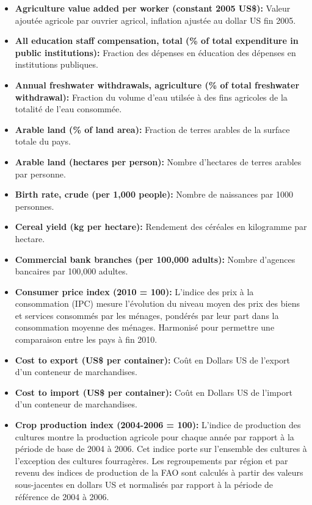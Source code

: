 \begin{itemize}
		\item \textbf{ Agriculture value added per worker (constant 2005 US\$):} Valeur ajoutée agricole par ouvrier agricol, inflation ajustée au dollar US fin 2005.
		\item \textbf{ All education staff compensation, total (\% of total expenditure in public institutions):} Fraction des dépenses en éducation des dépenses en institutions publiques.
		\item \textbf{ Annual freshwater withdrawals, agriculture (\% of total freshwater withdrawal):} Fraction du volume d'eau utilsée à des fins agricoles de la totalité de l'eau consommée.
		\item \textbf{ Arable land (\% of land area):} Fraction de terres arables de la surface totale du pays.
		\item \textbf{ Arable land (hectares per person):} Nombre d'hectares de terres arables par personne.
		\item \textbf{ Birth rate, crude (per 1,000 people):} Nombre de naissances par 1000 personnes.
		\item \textbf{ Cereal yield (kg per hectare):} Rendement des céréales en kilogramme par hectare.
		\item \textbf{ Commercial bank branches (per 100,000 adults):} Nombre d'agences bancaires par 100,000 adultes.
		\item \textbf{ Consumer price index (2010 = 100):} L'indice des prix à la consommation (IPC) mesure l'évolution du niveau moyen des prix des biens et services consommés par les ménages, pondérés par leur part dans la consommation moyenne des ménages. Harmonisé pour permettre une comparaison entre les pays à fin 2010.
		\item \textbf{ Cost to export (US\$ per container):} Coût en Dollars US de l'export d'un conteneur de marchandises.
		\item \textbf{ Cost to import (US\$ per container):} Coût en Dollars US de l'import d'un conteneur de marchandises.
		\item \textbf{ Crop production index (2004-2006 = 100):} 
		L'indice de production des cultures montre la production agricole pour chaque année par rapport à la période de base de 2004 à 2006. Cet indice porte sur l'ensemble des cultures à l'exception des cultures fourragères. Les regroupements par région et par revenu des indices de production de la FAO sont calculés à partir des valeurs sous-jacentes en dollars US et normalisés par rapport à la période de référence de 2004 à 2006.

\end{itemize}

